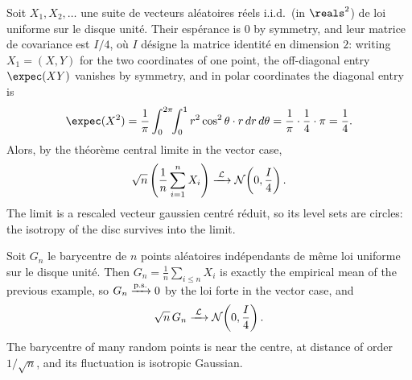 \begin{example}
  Soit $X_{1}, X_{2}, \dots$ une suite de vecteurs aléatoires réels i.i.d.\ (in
  $\reals^{2}$) de loi uniforme sur le disque unité. Their espérance is $0$ by
  symmetry, and leur matrice de covariance est $I/4$, où $I$ désigne la matrice
  identité en dimension $2$: writing
  $X_{1} = (X, Y)$ for the two coordinates of one point, the off-diagonal entry
  $\expec(XY)$ vanishes by symmetry, and in polar coordinates the diagonal entry
  is
  \[
    \expec(X^{2}) = \frac{1}{\pi}\int_{0}^{2\pi}\!\!\int_{0}^{1}
      r^{2}\cos^{2}\theta \cdot r \, dr \, d\theta
    = \frac{1}{\pi} \cdot \frac{1}{4} \cdot \pi = \frac{1}{4} .
  \]
  Alors, by the théorème central limite in the vector case,
  \[
    \sqrt{n}\left(\frac{1}{n}\sum_{i=1}^{n} X_{i}\right)
      \xrightarrow{\;\mathcal{L}\;} \mathcal{N}\!\left(0, \frac{I}{4}\right) .
  \]
  The limit is a rescaled vecteur gaussien centré réduit, so its level sets are
  circles: the isotropy of the disc survives into the limit.
\end{example}

\begin{example}
  Soit $G_{n}$ le barycentre de $n$ points aléatoires indépendants de même loi
  uniforme sur le disque unité. Then $G_{n} = \frac{1}{n}\sum_{i \leq n} X_{i}$
  is exactly the empirical mean of the previous example, so $G_{n} \xrightarrow{\text{p.s.}} 0$ by
  the loi forte in the vector case, and
  \[
    \sqrt{n}\, G_{n} \xrightarrow{\;\mathcal{L}\;} \mathcal{N}\!\left(0, \frac{I}{4}\right) .
  \]
  The barycentre of many random points is near the centre, at distance of order
  $1/\sqrt{n}$, and its fluctuation is isotropic Gaussian.
\end{example}

